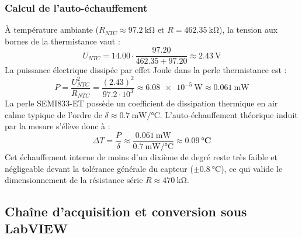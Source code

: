 \subsubsection*{Calcul de l'auto-échauffement}
À température ambiante ($R_{NTC} \approx \qty{97.2}{\kilo\ohm}$ et $R = \qty{462.35}{\kilo\ohm}$), la tension aux bornes de la thermistance vaut :
\begin{equation}
    U_{NTC} = 14.00 \cdot \frac{97.20}{462.35 + 97.20} \approx \qty{2.43}{\volt}
\end{equation}
La puissance électrique dissipée par effet Joule dans la perle thermistance est :
\begin{equation}
    P = \frac{U_{NTC}^2}{R_{NTC}} = \frac{(2.43)^2}{97.2 \cdot 10^3} \approx \qty{6.08e-5}{\watt} \approx \qty{0.061}{\milli\watt}
\end{equation}
La perle SEMI833-ET possède un coefficient de dissipation thermique en air calme typique de l'ordre de $\delta \approx \qty{0.7}{\milli\watt\per\degreeCelsius}$. L'auto-échauffement théorique induit par la mesure s'élève donc à :
\begin{equation}
    \Delta T = \frac{P}{\delta} \approx \frac{\qty{0.061}{\milli\watt}}{\qty{0.7}{\milli\watt\per\degreeCelsius}} \approx \mathbf{\qty{0.09}{\degreeCelsius}}
\end{equation}
Cet échauffement interne de moins d'un dixième de degré reste très faible et négligeable devant la tolérance générale du capteur ($\pm \qty{0.8}{\degreeCelsius}$), ce qui valide le dimensionnement de la résistance série $R \approx \qty{470}{\kilo\ohm}$.

\subsection{Chaîne d'acquisition et conversion sous LabVIEW}
\label{subsec:ntc_labview}

